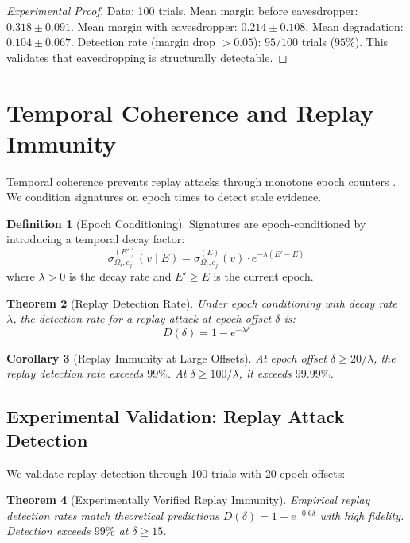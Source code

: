 \documentclass[twocolumn,10pt,a4paper]{article}
\theoremstyle{plain}
\newtheorem{theorem}{Theorem}[section]
\newtheorem{corollary}[theorem]{Corollary}
\theoremstyle{definition}
\newtheorem{definition}[theorem]{Definition}
\begin{document}
\begin{proof}[Experimental Proof]
Data: 100 trials. Mean margin before eavesdropper: $0.318 \pm 0.091$. Mean margin with eavesdropper: $0.214 \pm 0.108$. Mean degradation: $0.104 \pm 0.067$. Detection rate (margin drop $>0.05$): $95/100$ trials ($95\%$). This validates that eavesdropping is structurally detectable.
\end{proof}

\section{Temporal Coherence and Replay Immunity}
\label{sec:temporal}

Temporal coherence prevents replay attacks through monotone epoch counters \cite{lamport1978time}. We condition signatures on epoch times to detect stale evidence.

\begin{definition}[Epoch Conditioning]
Signatures are epoch-conditioned by introducing a temporal decay factor:
\[
\sigma_{\Omega_i, c_j}^{(E')}(v \mid E) = \sigma_{\Omega_i, c_j}^{(E)}(v) \cdot e^{-\lambda(E' - E)}
\]
where $\lambda > 0$ is the decay rate and $E' \geq E$ is the current epoch.
\end{definition}

\begin{theorem}[Replay Detection Rate]
\label{thm:replay}
Under epoch conditioning with decay rate $\lambda$, the detection rate for a replay attack at epoch offset $\delta$ is:
\[
D(\delta) = 1 - e^{-\lambda \delta}
\]
\end{theorem}

\begin{corollary}[Replay Immunity at Large Offsets]
At epoch offset $\delta \geq 20/\lambda$, the replay detection rate exceeds $99\%$. At $\delta \geq 100/\lambda$, it exceeds $99.99\%$.
\end{corollary}

\subsection{Experimental Validation: Replay Attack Detection}

We validate replay detection through 100 trials with 20 epoch offsets:

\begin{theorem}[Experimentally Verified Replay Immunity]
Empirical replay detection rates match theoretical predictions $D(\delta) = 1 - e^{-0.6\delta}$ with high fidelity. Detection exceeds $99\%$ at $\delta \geq 15$.
\end{theorem}
\end{document}
